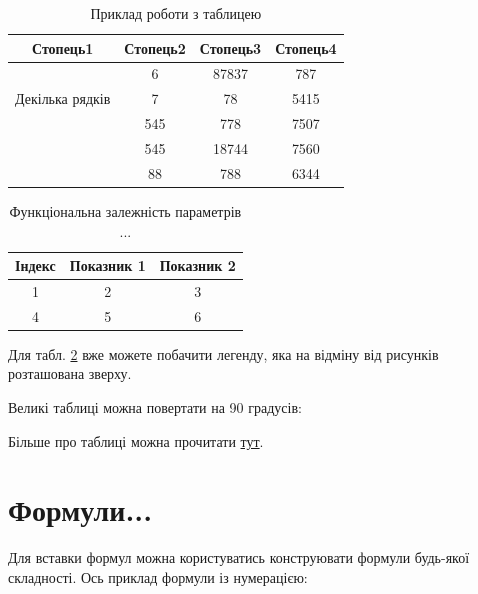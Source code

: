 \begin{table}[h!]
\centering
\begin{tabular}{|c|c|c|c|} 
 \hline
 Стопець1 & Стопець2 & Стопець3 & Стопець4 \\ [0.5ex] 
 \hline
 \multirow{3}{5em}{Декілька рядків} & 6 & 87837 & 787 \\ 
  &  7 & 78 & 5415 \\
   & 545 & 778 & 7507 \\
   & 545 & 18744 & 7560 \\
   & 88 & 788 & 6344 \\ [1ex] 
 \hline
\end{tabular}
\caption{Приклад роботи з таблицею}
\label{table:1}
\end{table}

\begin{table}[h]
	\caption{\label{table:2}Функціональна залежність параметрів ...}
	\begin{tabular}{|c|c|c|}
		\hline 
		Індекс & Показник 1 & Показник 2\tabularnewline
		\hline 
		\hline 
		1 & 2 & 3\tabularnewline
		\hline 
		4 & 5 & 6\tabularnewline
		\hline 
	\end{tabular}
\end{table}

Для табл. \ref{table:2} вже можете побачити легенду, яка на відміну від рисунків розташована зверху.

Великі таблиці можна повертати на 90 градусів:


Більше про таблиці можна прочитати \href{https://www.overleaf.com/learn/latex/Tables}{тут}.

\clearpage{}

\section{Формули...}
Для вставки формул можна користуватись конструювати формули будь-якої складності. Ось приклад формули із нумерацією:

